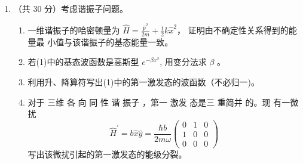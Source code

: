 \begin{enumerate}
\banswer{
	
}



\item 
（共 30 分）考虑谐振子问题。
\begin{enumerate}
	\item
	一维谐振子的哈密顿量为 $\hat{H}=\frac{\hat{p}^{2}}{2 m}+\frac{1}{2} k \hat{x}^{2}$，
	证明由不确定性关系得到的能量最
	小值与该谐振子的基态能量一致。
	\item 
	若(1)中的基态波函数是高斯型 $e^{-\beta x^{2}}$, 用变分法求 $\beta$ 。
	\item 
	利用升、降算符写出(1)中的第一激发态的波函数（不必归一)。
	\item 
	对于 三维 各 向 同 性 谐 振子 ，第一 激发 态是三 重简并 的。现 有一微 扰
	\[ 
	\hat{H}^{\prime}=b \hat{x} \hat{y}=\frac{\hbar b}{2 m \omega}\left(\begin{array}{ccc}0 & 1 & 0 \\ 1 & 0 & 0 \\ 0 & 0 & 0\end{array}\right)
	 \]
	写出该微扰引起的第一激发态的能级分裂。
\end{enumerate}


\banswer{
	
}


\end{enumerate}


